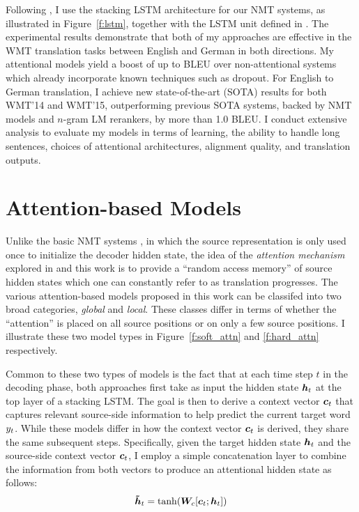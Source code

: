Following \cite{sutskever14,luong15}, I use the stacking LSTM architecture for our NMT systems, as illustrated in Figure~\ref{f:lstm}, together with the LSTM unit defined in \cite{zaremba14}.
The experimental results demonstrate that both of my approaches are
effective in the WMT translation tasks between English and German in  both
directions. My attentional models yield a boost of up to \attngain{} BLEU over
non-attentional systems which already incorporate known techniques such as
dropout. For English to German translation, I achieve new state-of-the-art
(SOTA)
results for both WMT'14 and WMT'15, outperforming previous SOTA systems, backed by
NMT models and $n$-gram LM rerankers, by more than 1.0 BLEU. I conduct
extensive analysis to evaluate my models in terms of learning, the ability to
handle long sentences, choices of attentional architectures, alignment quality, and translation
outputs. 

\section{Attention-based Models}
\label{sec:attn}
Unlike the basic NMT systems \cite{kal13,sutskever14,cho14,luong15}, in which the source representation is only used once to initialize the decoder hidden state, the idea of the {\it attention mechanism} explored in \cite{bog15,jean15} and this work is to provide a ``random access memory'' of source hidden states which one can constantly refer to as translation progresses.
The various attention-based models proposed in this work can be classifed into two broad categories, {\it global} and {\it local}. These classes differ in terms of whether the ``attention'' is placed on all source positions or on only a few source positions. I illustrate these two model types in Figure~\ref{f:soft_attn} and \ref{f:hard_attn} respectively.

Common to these two types of models is the fact that at each time step $t$ in the decoding phase, both approaches first take as input the hidden state $\mbox{\boldmath{$h$}}_{t}$ at the top layer of a stacking LSTM. The goal is then to derive a context vector $\mbox{\boldmath{$c$}}_{t}$ that captures relevant source-side information to help predict the current target word $y_{t}$. While these models differ in how the context vector $\mbox{\boldmath{$c$}}_{t}$ is derived, they share the same subsequent steps. 
Specifically, given the target hidden state $\mbox{\boldmath{$h$}}_{t}$ and the source-side context vector $\mbox{\boldmath{$c$}}_{t}$, I employ a simple concatenation layer to combine the information from both vectors to produce an attentional hidden state as follows:
\begin{equation}
\mbox{\boldmath{$\tilde{h}$}}_{t} = \tanh(\bm{W}_{c}[\mbox{\boldmath{$c$}}_{t}; \mbox{\boldmath{$h$}}_{t}])
\label{e:hs}
\end{equation} 


